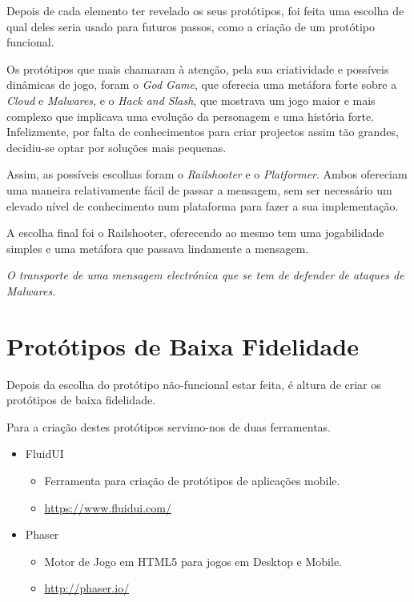 Depois de cada elemento ter revelado os seus protótipos, foi feita uma escolha de qual deles seria usado para futuros passos, como a criação de um protótipo funcional.

Os protótipos que mais chamaram à atenção, pela sua criatividade e possíveis dinâmicas de jogo, foram o \textit{God Game}, que oferecia uma metáfora forte sobre a \textit{Cloud} e \textit{Malwares}, e o \textit{Hack and Slash}, que mostrava um jogo maior e mais complexo que implicava uma evolução da personagem e uma história forte. Infelizmente, por falta de conhecimentos para criar projectos assim tão grandes, decidiu-se optar por soluções mais pequenas.

Assim, as possíveis escolhas foram o \textit{Railshooter} e o \textit{Platformer}. Ambos ofereciam uma maneira relativamente fácil de passar a mensagem, sem ser necessário um elevado nível de conhecimento num plataforma para fazer a sua implementação.

A escolha final foi o Railshooter, oferecendo ao mesmo tem uma jogabilidade simples e uma metáfora que passava lindamente a mensagem.

\emph{O transporte de uma mensagem electrónica que se tem de defender de ataques de Malwares.}

\section{Protótipos de Baixa Fidelidade}

Depois da escolha do protótipo não-funcional estar feita, é altura de criar os protótipos de baixa fidelidade.

Para a criação destes protótipos servimo-nos de duas ferramentas.
\begin{itemize}
\item FluidUI
\begin{itemize}
\item Ferramenta para criação de protótipos de aplicações mobile.
\item \url{https://www.fluidui.com/}
\end{itemize}
\item Phaser
\begin{itemize}
\item Motor de Jogo em HTML5 para jogos em Desktop e Mobile.
\item \url{http://phaser.io/}
\end{itemize}
\end{itemize}

